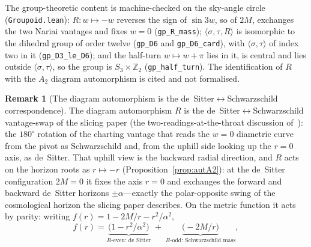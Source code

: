 \documentclass[11pt,a4paper]{article}
\theoremstyle{definition}
\newtheorem{remark}[theorem]{Remark}
\begin{document}
The group-theoretic content is machine-checked on the sky-angle circle (\texttt{Groupoid.lean}): $R:w\mapsto-w$ reverses the sign of $\sin3w$, so of $2M$, exchanges the two Nariai vantages and fixes $w=0$ (\texttt{gp\_R\_mass}); $\langle\sigma,\tau,R\rangle$ is isomorphic to the dihedral group of order twelve (\texttt{gp\_D6} and \texttt{gp\_D6\_card}), with $\langle\sigma,\tau\rangle$ of index two in it (\texttt{gp\_D3\_le\_D6}); and the half-turn $w\mapsto w+\pi$ lies in it, is central and lies outside $\langle\sigma,\tau\rangle$, so the group is $S_{3}\times\mathbb{Z}_{2}$ (\texttt{gp\_half\_turn}). The identification of $R$ with the $A_{2}$ diagram automorphism is cited and not formalised.

\begin{remark}[The diagram automorphism is the de~Sitter$\leftrightarrow$Schwarzschild correspondence]\label{rem:P-dS-Schw}
The diagram automorphism $R$ is the de~Sitter$\leftrightarrow$Schwarzschild vantage-swap of the slicing paper (the two-readings-at-the-throat discussion of~\cite{JanzenSlicing}): the $180^{\circ}$ rotation of the charting vantage that reads the $w=0$ diametric curve from the pivot as Schwarzschild and, from the uphill side looking up the $r=0$ axis, as de~Sitter. That uphill view is the backward radial direction, and $R$ acts on the horizon roots as $r\mapsto-r$ (Proposition~\ref{prop:autA2}): at the de~Sitter configuration $2M=0$ it fixes the axis $r=0$ and exchanges the forward and backward de~Sitter horizons $\pm\alpha$---exactly the polar-opposite swing of the cosmological horizon the slicing paper describes. On the metric function it acts by parity: writing $f(r)=1-2M/r-r^{2}/\alpha^{2}$,
\[
f(r)=\underbrace{\bigl(1-r^{2}/\alpha^{2}\bigr)}_{R\text{-even: de~Sitter}}\;+\;\underbrace{\bigl(-2M/r\bigr)}_{R\text{-odd: Schwarzschild mass}},
\]

\end{remark}
\end{document}
